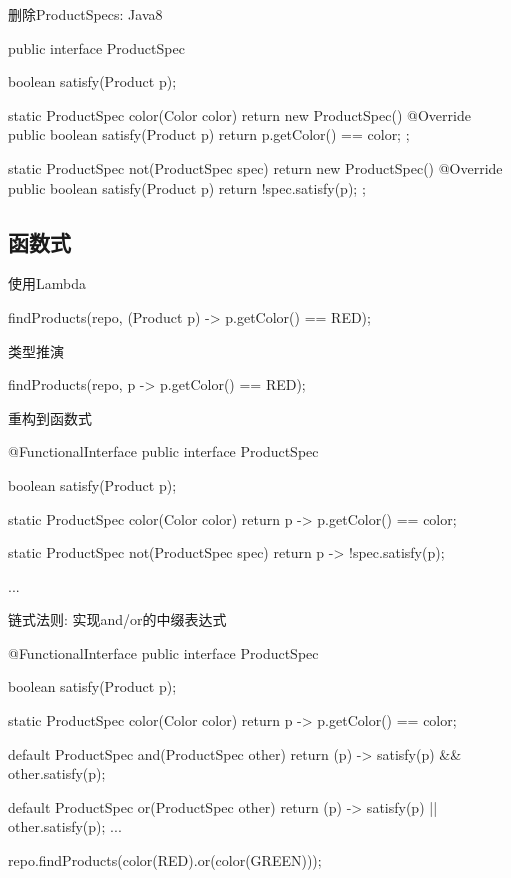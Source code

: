 \begin{frame}[fragile]{删除ProductSpecs: Java8}
  \begin{java}
public interface ProductSpec {
  boolean satisfy(Product p);

  static ProductSpec color(Color color) {
    return new ProductSpec() {
      @Override
      public boolean satisfy(Product p) {
        return p.getColor() == color;
      }
    };
  }

  static ProductSpec not(ProductSpec spec) {
    return new ProductSpec() {
      @Override
      public boolean satisfy(Product p) {
        return !spec.satisfy(p);
      }
    };
  }
}
  \end{java}
\end{frame}

\subsection{函数式}

\begin{frame}[fragile]{使用Lambda}
  \begin{java}
findProducts(repo, (Product p) -> p.getColor() == RED);
  \end{java}
\end{frame}

\begin{frame}[fragile]{类型推演}
  \begin{java}
findProducts(repo, p -> p.getColor() == RED);
  \end{java}
\end{frame}

\begin{frame}[fragile]{重构到函数式}
  \begin{java}
@FunctionalInterface
public interface ProductSpec {
  boolean satisfy(Product p);

  static ProductSpec color(Color color) {
    return p -> p.getColor() == color;
  }

  static ProductSpec not(ProductSpec spec) {
    return p -> !spec.satisfy(p);
  }

  ...
}
  \end{java}
\end{frame}

\begin{frame}[fragile]{链式法则: 实现and/or的中缀表达式}
  \begin{java}
@FunctionalInterface
public interface ProductSpec {
  boolean satisfy(Product p);

  static ProductSpec color(Color color) {
    return p -> p.getColor() == color;
  }

  default ProductSpec and(ProductSpec other) {
    return (p) -> satisfy(p) && other.satisfy(p);
  }

  default ProductSpec or(ProductSpec other) {
    return (p) -> satisfy(p) || other.satisfy(p);
  }
  ...
}

repo.findProducts(color(RED).or(color(GREEN)));
  \end{java}
\end{frame}

